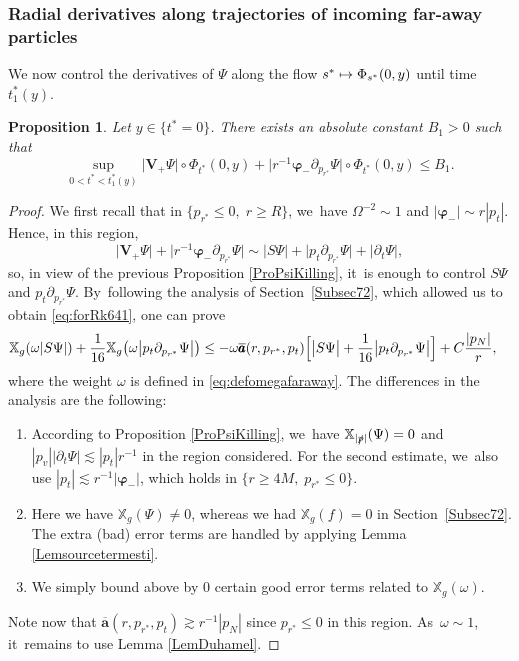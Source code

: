 \documentclass[10pt]{amsart}
\newcommand\mto{\mathchoice{\longmapsto}{\mapsto}{\mapsto}{\mapsto}}
\theoremstyle{plain}
\newtheorem{proposition}{Proposition}[section]
\theoremstyle{definition}
\newcommand\T{{\mathbb{X}}}
\begin{document}
\subsubsection{Radial derivatives along trajectories of incoming far-away particles}

We now control the derivatives of $\Psi$ along the flow $s^* \mto \Phi_{s^*} (0,y)$ until time $t^*_1(y)$.
\begin{proposition}\label{ProfarawayincoPsi}
Let $y \in \{ t^*=0 \}$. There exists an absolute constant $B_1>0$ such that
\[
\sup_{0 < t^* < t^*_1(y)} \big| \pmb{V}_{\! +}\Psi \big|\circ \Phi_{t^*}(0,y)+\big|r^{-1} \pmb{\varphi}_- \partial_{p_{r^*}} \Psi \big|\circ \Phi_{t^*}(0,y) \leq B_1.
\]
\end{proposition}

\begin{proof}
We first recall that in $\{ p_{r^*} \leq 0, \; r \geq R \}$, we~have $\Omega^{-2} \sim 1$ and $|\pmb{\varphi}_-| \sim r|p_t|$. Hence, in this region,
\[
\big| \pmb{V}_{\! +} \Psi \big| +\big|r^{-1} \pmb{\varphi}_- \partial_{p_{r^*}} \Psi \big| \sim \big| S \Psi \big| +\big|p_t \partial_{p_{r^*}} \Psi \big|+\big|\partial_t \Psi \big|,
\]
so, in view of the previous Proposition \ref{ProPsiKilling}, it~is enough to control $S \Psi$ and $p_t \partial_{p_{r^*}} \Psi$. By~following the analysis of Section~\ref{Subsec72}, which allowed us to obtain \eqref{eq:forRk641}, one can prove
\begin{align} \nonumber
& \T_g(\omega | S \Psi|)+ \frac{1}{16}\T_g \bigl(\omega \big|p_t \partial_{p_{r^*}} \Psi \big| \bigr) \leq -\omega \overline{\pmb{a}}(r,p_{r^*},p_t) \Bigl[\big|S \Psi \big| + \frac{1}{16}\big|p_t \partial_{p_{r^*}} \Psi \big| \Bigr]+C\frac{|p_N|}{r},
\end{align}
where the weight $\omega$ is defined in \eqref{eq:defomegafaraway}. The differences in the analysis are the following:
\begin{enumerate}
\item According to Proposition \ref{ProPsiKilling}, we~have $\T_{|\slashed{p}|}(\Psi)=0$ and $|p_v||\partial_t \Psi| \lesssim |p_t|r^{-1}$ in the region considered. For the second estimate, we~also use $|p_t| \lesssim r^{-1}|\pmb{\varphi}_-|$, which holds in $\{r \geq 4M, \; p_{r^*} \leq 0 \}$.
\item Here we have $\T_g(\Psi) \neq 0$, whereas we had $\T_g(f) =0$ in Section~\ref{Subsec72}. The extra (bad) error terms are handled by applying Lemma \ref{Lemsourcetermesti}.
\item We simply bound above by $0$ certain good error terms related to $\T_g(\omega)$.
\end{enumerate}
Note now that $\overline{\pmb{a}}(r,p_{r^*},p_t)\! \gtrsim r^{-1}|p_N|$ since $p_{r^*}\! \leq 0$ in this region. As~$\omega \sim 1$, it~remains to use Lemma \ref{LemDuhamel}.
\end{proof}
\end{document}
